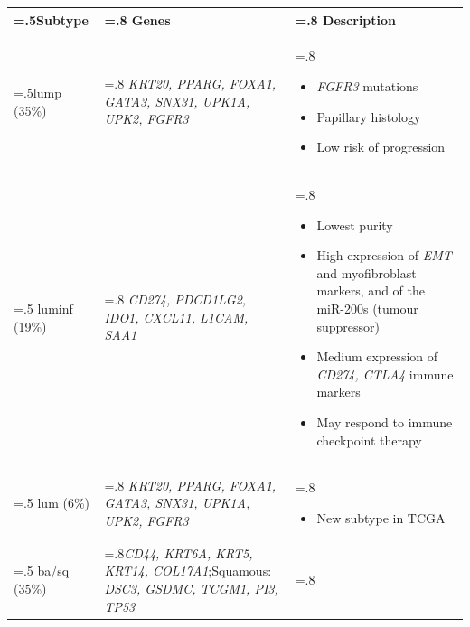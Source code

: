 \begin{table}[!htb]
    \centering
    \small
    \begin{tabularx}{\textwidth}{ >{\hsize=.5\hsize}X |>{\hsize=.8\hsize}X |>{\hsize=.8\hsize}X}
    \toprule
    Subtype & Genes & Description \\
    \midrule
    \acrlong{lump} (35\%) & \textit{KRT20, PPARG, FOXA1, GATA3, SNX31, UPK1A, UPK2, FGFR3} & 
    \begin{itemize}[leftmargin=*, nosep, after=\vspace{-\baselineskip}, before=\vspace{-.6\baselineskip}]
        \item \textit{FGFR3} mutations
        \item Papillary histology
        \item Low risk of progression
    \end{itemize} \\
    \midrule
    \acrlong{luminf} (19\%) & \textit{CD274, PDCD1LG2, IDO1, CXCL11, L1CAM, SAA1} & 
    \begin{itemize}[leftmargin=*, nosep, after=\vspace{-\baselineskip}, before=\vspace{-.6\baselineskip}]
        \item Lowest purity
        \item High expression of \textit{EMT} and myofibroblast markers, and of the miR-200s (tumour suppressor)
        \item Medium expression of \textit{CD274, CTLA4} immune markers
        \item May respond to immune checkpoint therapy
    \end{itemize} \\
    \midrule
    \acrlong{lum}  (6\%) & \textit{KRT20, PPARG, FOXA1, GATA3, SNX31, UPK1A, UPK2, FGFR3} & 
    \begin{itemize}[leftmargin=*, nosep, after=\vspace{-\baselineskip}, before=\vspace{-.6\baselineskip}]
        \item New subtype in TCGA
    \end{itemize} \\
    \midrule
    \acrlong{ba/sq}  (35\%) &\textit{CD44, KRT6A, KRT5, KRT14, COL17A1};Squamous: \textit{DSC3, GSDMC, TCGM1, PI3, TP53} & 
    \begin{itemize}[leftmargin=*, nosep, after=\vspace{-\baselineskip}, before=\vspace{-.6\baselineskip}]

\end{itemize}
\end{tabularx}
\end{table}
